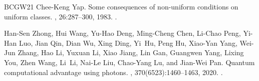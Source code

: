 \documentclass[10pt,a4paper]{article}
\begin{document}
\begin{thebibliography}{BCGW21}
Chee{-}Keng Yap.
\newblock Some consequences of non-uniform conditions on uniform classes.
, 26:287--300, 1983.
\newblock \href {https://doi.org/10.1016/0304-3975(83)90020-8}
  {}.

Han-Sen Zhong, Hui Wang, Yu-Hao Deng, Ming-Cheng Chen, Li-Chao Peng, Yi-Han
  Luo, Jian Qin, Dian Wu, Xing Ding, Yi~Hu, Peng Hu, Xiao-Yan Yang, Wei-Jun
  Zhang, Hao Li, Yuxuan Li, Xiao Jiang, Lin Gan, Guangwen Yang, Lixing You,
  Zhen Wang, Li~Li, Nai-Le Liu, Chao-Yang Lu, and Jian-Wei Pan.
\newblock Quantum computational advantage using photons.
, 370(6523):1460--1463, 2020.
\newblock \href {https://doi.org/10.1126/science.abe8770}
  {}.

\end{thebibliography}
\end{document}
